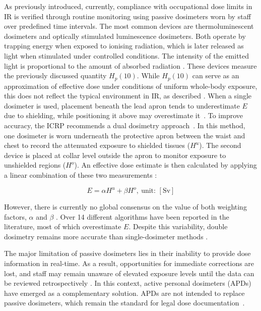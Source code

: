 As previously introduced, currently, compliance with occupational dose limits in IR is verified through routine monitoring using passive dosimeters worn by staff over predefined time intervals. The most common devices are thermoluminescent dosimeters and optically stimulated luminescence dosimeters. Both operate by trapping energy when exposed to ionising radiation, which is later released as light when stimulated under controlled conditions. The intensity of the emitted light is proportional to the amount of absorbed radiation \cite{11}. These devices measure the previously discussed quantity $H_p(10)$. While $H_p(10)$ can serve as an approximation of effective dose under conditions of uniform whole-body exposure, this does not reflect the typical environment in IR, as described \cite{64}. When a single dosimeter is used, placement beneath the lead apron tends to underestimate $E$ due to shielding, while positioning it above may overestimate it~\cite{30}. To improve accuracy, the ICRP recommends a dual dosimetry approach~\cite{51}. In this method, one dosimeter is worn underneath the protective apron between the waist and chest to record the attenuated exposure to shielded tissues ($H^u$). The second device is placed at collar level outside the apron to monitor exposure to unshielded regions ($H^o$). An effective dose estimate is then calculated by applying a linear combination of these two measurements \cite{65}:

\begin{equation}
E = \alpha H^u + \beta H^o,\ \text{unit: } [\mathrm{Sv}]
\label{eq:dual_dosimetry}
\end{equation}

However, there is currently no global consensus on the value of both weighting factors, $\alpha$ and $\beta$ \cite{65}. Over 14 different algorithms have been reported in the literature, most of which overestimate $E$. Despite this variability, double dosimetry remains more accurate than single-dosimeter methods \cite{66}.

The major limitation of passive dosimeters lies in their inability to provide dose information in real-time. As a result, opportunities for immediate corrections are lost, and staff may remain unaware of elevated exposure levels until the data can be reviewed retrospectively \cite{46,68}. In this context, active personal dosimeters (APDs) have emerged as a complementary solution. APDs are not intended to replace passive dosimeters, which remain the standard for legal dose documentation~\cite{2,3}.

